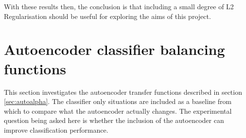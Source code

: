         With these results then, the conclusion is that including a small degree of L2
        Regularisation should be useful for exploring the aims of this project.


      \section{Autoencoder classifier balancing functions}
        This section investigates the autoencoder transfer functions described in section \ref{sec:autoalpha}.
        The classifier only situations are included as a baseline from which to compare
        what the autoencoder actually changes. The experimental question being asked here
        is whether the inclusion of the autoencoder can improve classification performance.



